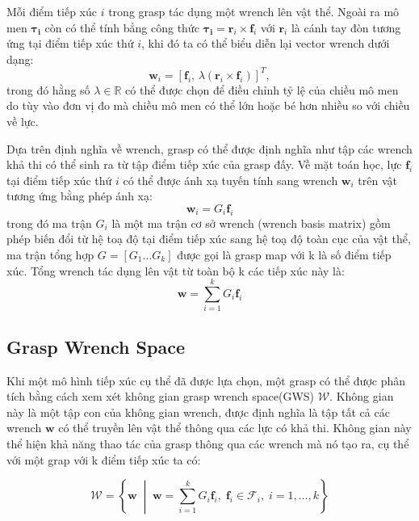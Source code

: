 Mỗi điểm tiếp xúc $i$ trong grasp tác dụng một wrench lên vật thể. Ngoài ra mô men $\boldsymbol{\tau_i}$ còn có thể tính bẳng công thức $\boldsymbol{\tau_i} = \mathbf{r}_i \times \mathbf{f}_i$ với $\mathbf{r}_i$ là cánh tay đòn tương ứng tại điểm tiếp xúc thứ $i$, khi đó ta có thể biểu diễn lại vector wrench dưới dạng:
\begin{equation}
    \mathbf{w}_i = [ \mathbf{f}_i, \,  \lambda (\mathbf{r}_i \times \mathbf{f}_i)]^{T},
\label{eq:wrench1}
\end{equation}
trong đó hằng số $\lambda \in \mathbb{R}$ có thể được chọn để điều chỉnh tỷ lệ của chiều mô men do tùy vào đơn vị đo mà chiều mô men có thể lớn hoặc bé hơn nhiều so với chiều về lực.

Dựa trên định nghĩa về wrench, grasp có thể được định nghĩa như tập các wrench khả thi có thể sinh ra từ tập điểm tiếp xúc của grasp đấy. Về mặt toán học, lực $\mathbf{f}_i$ tại điểm tiếp xúc thứ $i$ có thể được ánh xạ tuyến tính sang wrench $\mathbf{w}_i$ trên vật tương ứng bằng phép ánh xạ:
\begin{equation}
    \mathbf{w}_i = G_i \mathbf{f}_i
\label{eq:wrenchi}
\end{equation}
trong đó ma trận $G_i$ là một ma trận cơ sở wrench (wrench basis matrix) gồm phép biến đổi từ hệ toạ độ tại điểm tiếp xúc sang hệ toạ độ toàn cục của vật thể, ma trận tổng hợp $G = [G_1 \ldots G_k]$ được gọi là grasp map với k là số điểm tiếp xúc. Tổng wrench tác dụng lên vật từ toàn bộ k các tiếp xúc này là:
\begin{equation}
    \mathbf{w} = \sum_{i=1}^{k} G_i \mathbf{f}_i
\label{eq:wrench2}
\end{equation}

\subsection{Grasp Wrench Space}
Khi một mô hình tiếp xúc cụ thể đã được lựa chọn, một grasp có thể được phân tích bằng cách xem xét không gian grasp wrench space(GWS) $\mathcal{W}$. Không gian này là một tập con của không gian wrench, được định nghĩa là tập tất cả các wrench $\mathbf{w}$ có thể truyền lên vật thể thông qua các lực có khả thi. Không gian này thể hiện khả năng thao tác của grasp thông qua các wrench mà nó tạo ra, cụ thể với một grap với k điểm tiếp xúc ta có:

\begin{equation}
    \mathcal{W} = \left\{\mathbf{w} \;\middle|\;\mathbf{w} = \sum_{i=1}^{k} G_i \mathbf{f}_i,\;\mathbf{f}_i \in \mathcal{F}_i,\;i=1,\dots,k\right\}
\label{eq:gws}
\end{equation}

